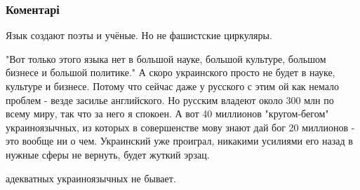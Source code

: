  
 
 
 
 
\subsubsection{Коментарі}

\begin{itemize}
 
Язык создают поэты и учёные. Но не фашистские циркуляры.

 

"Вот только этого языка нет в большой науке, большой культуре, большом бизнесе
и большой политике." А скоро украинского просто не будет в науке, культуре и
бизнесе. Потому что сейчас даже у русского с этим ой как немало проблем - везде
засилье английского. Но русским владеют около 300 млн по всему миру, так что за
него я спокоен. А вот 40 миллионов "кругом-бегом" украиноязычных, из которых в
совершенстве мову знают дай бог 20 миллионов - это вообще ни о чем. Украинский
уже проиграл, никакими усилиями его назад в нужные сферы не вернуть, будет
жуткий эрзац.

 
адекватных украиноязычных не бывает.

\begin{itemize}
 

\end{itemize}
\end{itemize}
